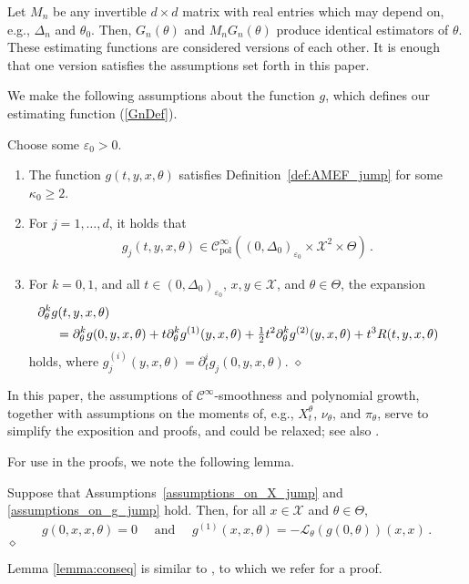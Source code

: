 \documentclass[11pt,a4paper]{article}
\newcommand{\thetan}{{\theta_0}}
\newcommand{\cc}{{\mathcal{C}}}
\renewcommand{\ll}{{\mathcal{L}}}
\newcommand{\xx}{{\mathcal{X}}}
\newcommand{\dqed}{{\leavevmode \unskip \penalty9999 \hbox{} \nobreak \hfill \quad \hbox{$\diamond$}}}
\numberwithin{equation}{section}
\numberwithin{theorem}{section}
\begin{document}
Let $M_n$ be any invertible $d\times d$ matrix with real entries which may depend on, e.g., $\Delta_n$ and $\thetan$. Then, $G_n(\theta)$ and $M_nG_n(\theta)$ produce identical estimators of $\theta$. These estimating functions are considered versions of each other. It is enough that one version satisfies the assumptions set forth in this paper. \medskip

We make the following assumptions about the function $g$, which defines our estimating function (\ref{GnDef}).
\begin{assumption}
Choose some $\varepsilon_0 > 0$.
\begin{enumerate}[label=(\roman{*}),ref=(\roman{*})] 
\item The function $g(t,y,x, \theta)$ satisfies Definition~\ref{def:AMEF_jump} for some ${\kappa_0} \geq 2$. 
\item \label{g_poly} For $j=1,\ldots,d$, it holds that
\begin{align*}
g_j(t,y,x, \theta) \in \cc^\infty_\text{pol}((0,\Delta_0)_{\varepsilon_0}\times \xx^2\times\Theta)\,.
\end{align*}
\item  For $k = 0,1$, and all $t \in (0,\Delta_0)_{\varepsilon_0}$, $x,y \in \xx$, and $\theta \in \Theta$, the expansion
\begin{align}
&\hspace{-5mm} \partial_\theta^kg(t, y, x, \theta) \nonumber\\
&= \partial_\theta^kg(0,y,x, \theta) + t \partial_\theta^kg^{(1)}(y,x, \theta) + \tfrac{1}{2}t^2\partial_\theta^kg^{(2)}(y,x, \theta) + t^3 R(t,y ,x, \theta)
\label{g2}
\end{align}
holds, where $g_j^{(i)}(y,x, \theta) = \partial^i_t g_j(0,y,x,\theta)$. \dqed
\end{enumerate}
\label{assumptions_on_g_jump}
\end{assumption}
%
In this paper, the assumptions of $\cc^\infty$-smoothness and polynomial growth, together with assumptions on the moments of, e.g., $X^\theta_t$, $\nu_\theta$, and $\pi_\theta$, serve to simplify the exposition and proofs, and could be relaxed; see also \cite[Chapter 3]{phdthesis}.
\medskip

For use in the proofs, we note the following lemma.
%
\begin{lemma}
Suppose that Assumptions~\ref{assumptions_on_X_jump} and \ref{assumptions_on_g_jump} hold. Then, for all $x\in \xx$ and $\theta \in \Theta$, 
\begin{align*}
g(0,x,x, \theta) = 0 \quad\text{ and }\quad g^{(1)}(x,x, \theta) = -\ll_\theta\left( g(0,\theta)\right)(x,x)\,.
\end{align*}\dqed
\label{lemma:conseq}
\end{lemma}
%
Lemma
\ref{lemma:conseq} is similar to \cite[Lemma 2.3]{efficient}, to which we refer for a proof.
\end{document}
